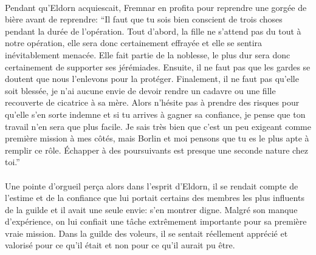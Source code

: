 \paragraph{}
Pendant qu'Eldorn acquiescait, Fremnar en profita pour reprendre une gorgée de
bière avant de reprendre: ``Il faut que tu sois bien conscient de trois choses
pendant la durée de l'opération. Tout d'abord, la fille ne s'attend pas du
tout à notre opération, elle sera donc certainement effrayée et elle se
sentira inévitablement menacée. Elle fait partie de la noblesse, le plus dur
sera donc certainement de supporter ses jérémiades. Ensuite, il ne faut pas
que les gardes se doutent que nous l'enlevons pour la protéger. Finalement, il
ne faut pas qu'elle soit blessée, je n'ai aucune envie de devoir rendre un
cadavre ou une fille recouverte de cicatrice à sa mère. Alors n'hésite pas à
prendre des risques pour qu'elle s'en sorte indemne et si tu arrives à gagner
sa confiance, je pense que ton travail n'en sera que plus facile. Je sais très
bien que c'est un peu exigeant comme première mission à mes côtés, mais Borlin
et moi pensons que tu es le plus apte à remplir ce rôle. Échapper à des
poursuivants est presque une seconde nature chez toi.''

\paragraph{}
Une pointe d'orgueil perça alors dans l'esprit d'Eldorn, il se rendait compte
de l'estime et de la confiance que lui portait certains des membres les plus
influents de la guilde et il avait une seule envie: s'en montrer digne. Malgré
son manque d'expérience, on lui confiait une tâche extrêmement importante pour
sa première vraie mission. Dans la guilde des voleurs, il se sentait
réellement apprécié et valorisé pour ce qu'il était et non pour ce qu'il
aurait pu être.